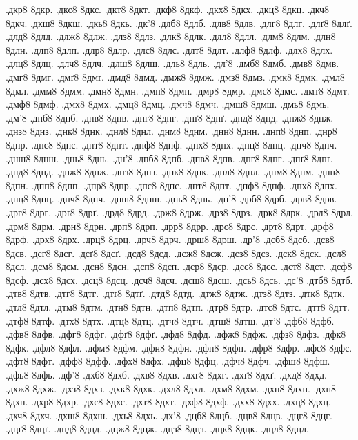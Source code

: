 {.дкр8
8дкр.
.дкс8
8дкс.
.дкт8
8дкт.
.дкф8
8дкф.
.дкх8
8дкх.
.дкц8
8дкц.
.дкч8
8дкч.
.дкш8
8дкш.
.дкь8
8дкь.
.дк'8
.длб8
8длб.
.длв8
8длв.
.длг8
8длг.
.длґ8
8длґ.
.длд8
8длд.
.длж8
8длж.
.длз8
8длз.
.длк8
8длк.
.длл8
8длл.
.длм8
8длм.
.длн8
8длн.
.длп8
8длп.
.длр8
8длр.
.длс8
8длс.
.длт8
8длт.
.длф8
8длф.
.длх8
8длх.
.длц8
8длц.
.длч8
8длч.
.длш8
8длш.
.дль8
8дль.
.дл'8
.дмб8
8дмб.
.дмв8
8дмв.
.дмг8
8дмг.
.дмґ8
8дмґ.
.дмд8
8дмд.
.дмж8
8дмж.
.дмз8
8дмз.
.дмк8
8дмк.
.дмл8
8дмл.
.дмм8
8дмм.
.дмн8
8дмн.
.дмп8
8дмп.
.дмр8
8дмр.
.дмс8
8дмс.
.дмт8
8дмт.
.дмф8
8дмф.
.дмх8
8дмх.
.дмц8
8дмц.
.дмч8
8дмч.
.дмш8
8дмш.
.дмь8
8дмь.
.дм'8
.днб8
8днб.
.днв8
8днв.
.днг8
8днг.
.днґ8
8днґ.
.днд8
8днд.
.днж8
8днж.
.днз8
8днз.
.днк8
8днк.
.днл8
8днл.
.днм8
8днм.
.днн8
8днн.
.днп8
8днп.
.днр8
8днр.
.днс8
8днс.
.днт8
8днт.
.днф8
8днф.
.днх8
8днх.
.днц8
8днц.
.днч8
8днч.
.днш8
8днш.
.днь8
8днь.
.дн'8
.дпб8
8дпб.
.дпв8
8дпв.
.дпг8
8дпг.
.дпґ8
8дпґ.
.дпд8
8дпд.
.дпж8
8дпж.
.дпз8
8дпз.
.дпк8
8дпк.
.дпл8
8дпл.
.дпм8
8дпм.
.дпн8
8дпн.
.дпп8
8дпп.
.дпр8
8дпр.
.дпс8
8дпс.
.дпт8
8дпт.
.дпф8
8дпф.
.дпх8
8дпх.
.дпц8
8дпц.
.дпч8
8дпч.
.дпш8
8дпш.
.дпь8
8дпь.
.дп'8
.дрб8
8дрб.
.дрв8
8дрв.
.дрг8
8дрг.
.дрґ8
8дрґ.
.дрд8
8дрд.
.држ8
8држ.
.дрз8
8дрз.
.дрк8
8дрк.
.дрл8
8дрл.
.дрм8
8дрм.
.дрн8
8дрн.
.дрп8
8дрп.
.дрр8
8дрр.
.дрс8
8дрс.
.дрт8
8дрт.
.дрф8
8дрф.
.дрх8
8дрх.
.дрц8
8дрц.
.дрч8
8дрч.
.дрш8
8дрш.
.др'8
.дсб8
8дсб.
.дсв8
8дсв.
.дсг8
8дсг.
.дсґ8
8дсґ.
.дсд8
8дсд.
.дсж8
8дсж.
.дсз8
8дсз.
.дск8
8дск.
.дсл8
8дсл.
.дсм8
8дсм.
.дсн8
8дсн.
.дсп8
8дсп.
.дср8
8дср.
.дсс8
8дсс.
.дст8
8дст.
.дсф8
8дсф.
.дсх8
8дсх.
.дсц8
8дсц.
.дсч8
8дсч.
.дсш8
8дсш.
.дсь8
8дсь.
.дс'8
.дтб8
8дтб.
.дтв8
8дтв.
.дтг8
8дтг.
.дтґ8
8дтґ.
.дтд8
8дтд.
.дтж8
8дтж.
.дтз8
8дтз.
.дтк8
8дтк.
.дтл8
8дтл.
.дтм8
8дтм.
.дтн8
8дтн.
.дтп8
8дтп.
.дтр8
8дтр.
.дтс8
8дтс.
.дтт8
8дтт.
.дтф8
8дтф.
.дтх8
8дтх.
.дтц8
8дтц.
.дтч8
8дтч.
.дтш8
8дтш.
.дт'8
.дфб8
8дфб.
.дфв8
8дфв.
.дфг8
8дфг.
.дфґ8
8дфґ.
.дфд8
8дфд.
.дфж8
8дфж.
.дфз8
8дфз.
.дфк8
8дфк.
.дфл8
8дфл.
.дфм8
8дфм.
.дфн8
8дфн.
.дфп8
8дфп.
.дфр8
8дфр.
.дфс8
8дфс.
.дфт8
8дфт.
.дфф8
8дфф.
.дфх8
8дфх.
.дфц8
8дфц.
.дфч8
8дфч.
.дфш8
8дфш.
.дфь8
8дфь.
.дф'8
.дхб8
8дхб.
.дхв8
8дхв.
.дхг8
8дхг.
.дхґ8
8дхґ.
.дхд8
8дхд.
.дхж8
8дхж.
.дхз8
8дхз.
.дхк8
8дхк.
.дхл8
8дхл.
.дхм8
8дхм.
.дхн8
8дхн.
.дхп8
8дхп.
.дхр8
8дхр.
.дхс8
8дхс.
.дхт8
8дхт.
.дхф8
8дхф.
.дхх8
8дхх.
.дхц8
8дхц.
.дхч8
8дхч.
.дхш8
8дхш.
.дхь8
8дхь.
.дх'8
.дцб8
8дцб.
.дцв8
8дцв.
.дцг8
8дцг.
.дцґ8
8дцґ.
.дцд8
8дцд.
.дцж8
8дцж.
.дцз8
8дцз.
.дцк8
8дцк.
.дцл8
8дцл.
}
